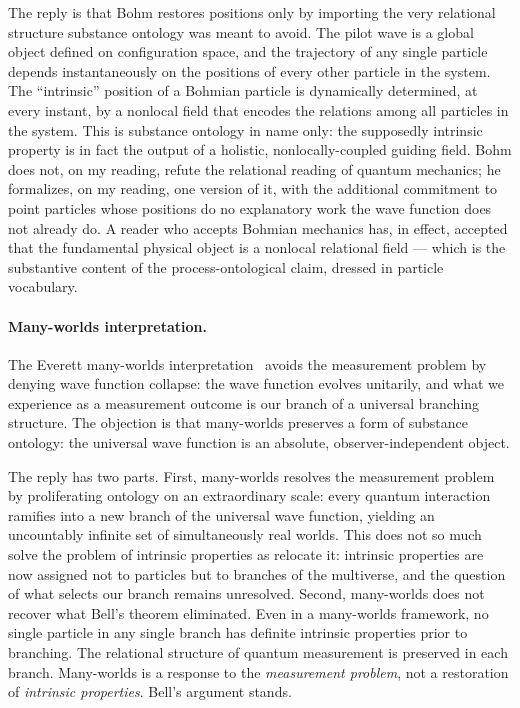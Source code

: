 The reply is that Bohm restores positions only by importing the very
relational structure substance ontology was meant to avoid.
The pilot wave is a global object defined on configuration space, and the
trajectory of any single particle depends instantaneously on the positions
of every other particle in the system.
The ``intrinsic'' position of a Bohmian particle is dynamically determined,
at every instant, by a nonlocal field that encodes the relations among all
particles in the system.
This is substance ontology in name only: the supposedly intrinsic property
is in fact the output of a holistic, nonlocally-coupled guiding field.
Bohm does not, on my reading, refute the relational reading of quantum
mechanics; he formalizes, on my reading, one version of it, with the
additional commitment to point particles whose positions do no explanatory
work the wave function does not already do.
A reader who accepts Bohmian mechanics has, in effect, accepted that the
fundamental physical object is a nonlocal relational field --- which is
the substantive content of the process-ontological claim, dressed in
particle vocabulary.

\paragraph{Many-worlds interpretation.}
The Everett many-worlds interpretation~\citep{Everett1957,Wallace2012} avoids the
measurement problem by denying wave function collapse: the wave function
evolves unitarily, and what we experience as a measurement outcome is
our branch of a universal branching structure.
The objection is that many-worlds preserves a form of substance ontology:
the universal wave function is an absolute, observer-independent object.

The reply has two parts.
First, many-worlds resolves the measurement problem by proliferating
ontology on an extraordinary scale: every quantum interaction ramifies
into a new branch of the universal wave function, yielding an uncountably
infinite set of simultaneously real worlds.
This does not so much solve the problem of intrinsic properties as
relocate it: intrinsic properties are now assigned not to particles
but to branches of the multiverse, and the question of what selects
our branch remains unresolved.
Second, many-worlds does not recover what Bell's theorem eliminated.
Even in a many-worlds framework, no single particle in any single
branch has definite intrinsic properties prior to branching.
The relational structure of quantum measurement is preserved in
each branch.
Many-worlds is a response to the \emph{measurement problem}, not
a restoration of \emph{intrinsic properties}.
Bell's argument stands.

